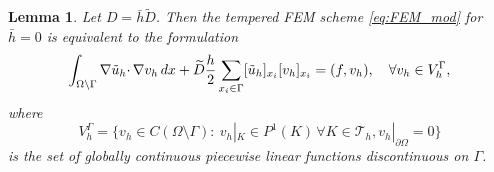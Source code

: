 \documentclass[10pt,a4paper]{amsart}
\newtheorem{lemma}{Lemma}
\def \Th {{\mathcal T}_h}
\def \d {{\rm d}}
\def\dx{\,\d x }
\def\tD{\widetilde{D}}
\def\tu{\tilde{u}}
\def\width{\bar{h}}
\begin{document}
\begin{lemma}
\label{lem:FEM_zero}
Let $D=\width\tD$. Then the tempered FEM scheme \eqref{eq:FEM_mod} for $\width=0$ is equivalent to the formulation
\begin{equation}
\label{eq:FEM_zero}
\int_{\Omega\setminus\Gamma} \nabla \tu_h\cdotp\nabla v_h \dx +\tD\frac{h}{2}\sum_{x_i\in\Gamma}[\tu_h]_{x_i}[v_h]_{x_i}=(f,v_h),\quad\forall v_h\in V_h^\Gamma,
\end{equation}
where
\begin{equation*}
V_h^\Gamma = \{v_h\in C(\Omega\setminus\Gamma):\ v_h|_K\in P^1(K)\,\forall K\in\Th, v_h|_{\partial\Omega}=0\}
\end{equation*}
is the set of globally continuous piecewise linear functions discontinuous on $\Gamma$.
\end{lemma}
\end{document}

